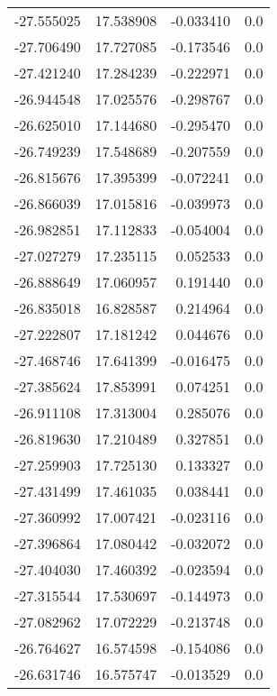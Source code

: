 \begin{tabular}{rrrr}
      -27.555025 &        17.538908 &   -0.033410 &   0.0 \\
      -27.706490 &        17.727085 &   -0.173546 &   0.0 \\
      -27.421240 &        17.284239 &   -0.222971 &   0.0 \\
      -26.944548 &        17.025576 &   -0.298767 &   0.0 \\
      -26.625010 &        17.144680 &   -0.295470 &   0.0 \\
      -26.749239 &        17.548689 &   -0.207559 &   0.0 \\
      -26.815676 &        17.395399 &   -0.072241 &   0.0 \\
      -26.866039 &        17.015816 &   -0.039973 &   0.0 \\
      -26.982851 &        17.112833 &   -0.054004 &   0.0 \\
      -27.027279 &        17.235115 &    0.052533 &   0.0 \\
      -26.888649 &        17.060957 &    0.191440 &   0.0 \\
      -26.835018 &        16.828587 &    0.214964 &   0.0 \\
      -27.222807 &        17.181242 &    0.044676 &   0.0 \\
      -27.468746 &        17.641399 &   -0.016475 &   0.0 \\
      -27.385624 &        17.853991 &    0.074251 &   0.0 \\
      -26.911108 &        17.313004 &    0.285076 &   0.0 \\
      -26.819630 &        17.210489 &    0.327851 &   0.0 \\
      -27.259903 &        17.725130 &    0.133327 &   0.0 \\
      -27.431499 &        17.461035 &    0.038441 &   0.0 \\
      -27.360992 &        17.007421 &   -0.023116 &   0.0 \\
      -27.396864 &        17.080442 &   -0.032072 &   0.0 \\
      -27.404030 &        17.460392 &   -0.023594 &   0.0 \\
      -27.315544 &        17.530697 &   -0.144973 &   0.0 \\
      -27.082962 &        17.072229 &   -0.213748 &   0.0 \\
      -26.764627 &        16.574598 &   -0.154086 &   0.0 \\
      -26.631746 &        16.575747 &   -0.013529 &   0.0 \\

\end{tabular}

